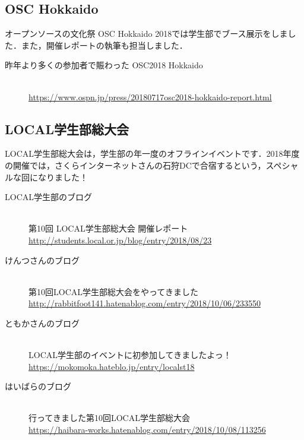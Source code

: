\subsection{OSC Hokkaido}
オープンソースの文化祭 OSC Hokkaido 2018では学生部でブース展示をしました．また，開催レポートの執筆も担当しました．\mbox{}\\
\begin{description}
\item[昨年より多くの参加者で賑わった OSC2018 Hokkaido]\mbox{}\\
\url{https://www.ospn.jp/press/20180717osc2018-hokkaido-report.html}
\end{description}

\subsection{LOCAL学生部総大会}
LOCAL学生部総大会は，学生部の年一度のオフラインイベントです．2018年度の開催では，さくらインターネットさんの石狩DCで合宿するという，スペシャルな回になりました！\mbox{}\\

\begin{description}
\item[LOCAL学生部のブログ]\mbox{}\\
第10回 LOCAL学生部総大会 開催レポート\mbox{}\\
\url{http://students.local.or.jp/blog/entry/2018/08/23}
\end{description}

\begin{description}
\item[けんつさんのブログ]\mbox{}\\
第10回LOCAL学生部総大会をやってきました\mbox{}\\
\url{http://rabbitfoot141.hatenablog.com/entry/2018/10/06/233550}
\end{description}

\begin{description}
\item[ともかさんのブログ]\mbox{}\\
LOCAL学生部のイベントに初参加してきましたよっ！\mbox{}\\
\url{https://mokomoka.hateblo.jp/entry/localst18}
\end{description}

\begin{description}
\item[はいばらのブログ]\mbox{}\\
行ってきました第10回LOCAL学生部総大会\mbox{}\\
\url{https://haibara-works.hatenablog.com/entry/2018/10/08/113256}
\end{description}

